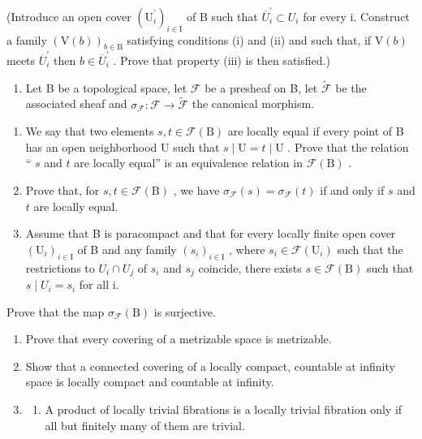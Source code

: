 (Introduce an open cover \((\mathrm{U}_{i}^{\prime})_{i\in\mathrm{I}}\) of B such that \(\overline{U}_{i}^{\prime}\subset U_{i}\) for every i. Construct a family \((\mathrm{V}(b))_{b\in\mathrm{B}}\) satisfying conditions (i) and (ii) and such that, if \(\mathrm{V}(b)\) meets \(\overline{U}_{i}^{\prime}\) then \(b\in\overline{U}_{i}^{\prime}\) . Prove that property (iii) is then satisfied.)

\begin{enumerate}
\def\labelenumi{\arabic{enumi})}
\setcounter{enumi}{7}
\tightlist
\item
  Let B be a topological space, let \(\mathcal{F}\) be a presheaf on B, let \(\widetilde{\mathcal{F}}\) be the associated sheaf and \(\sigma_{\mathcal{F}}\colon \mathcal{F}\to \widetilde{\mathcal{F}}\) the canonical morphism.
\end{enumerate}

\begin{enumerate}
\def\labelenumi{\alph{enumi})}
\item
  We say that two elements \(s, t \in \mathcal{F}(\mathrm{B})\) are locally equal if every point of B has an open neighborhood U such that \(s \mid \mathrm{U} = t \mid \mathrm{U}\) . Prove that the relation “ \(s\) and \(t\) are locally equal” is an equivalence relation in \(\mathcal{F}(\mathrm{B})\) .
\item
  Prove that, for \(s, t \in \mathcal{F}(\mathrm{B})\) , we have \(\sigma_{\mathcal{F}}(s) = \sigma_{\mathcal{F}}(t)\) if and only if \(s\) and \(t\) are locally equal.
\item
  Assume that B is paracompact and that for every locally finite open cover \((\mathrm{U}_{i})_{i\in\mathrm{I}}\) of B and any family \((s_{i})_{i\in\mathrm{I}}\) , where \(s_{i}\in\mathcal{F}(\mathrm{U}_{i})\) such that the restrictions to \(U_{i}\cap U_{j}\) of \(s_{i}\) and \(s_{j}\) coincide, there exists \(s\in\mathcal{F}(\mathrm{B})\) such that \(s\mid U_{i}=s_{i}\) for all i.
\end{enumerate}

Prove that the map \(\sigma_{\mathcal{F}}(\mathrm{B})\) is surjective.

\exercisegroup

\begin{enumerate}
\def\labelenumi{\arabic{enumi})}
\item
  Prove that every covering of a metrizable space is metrizable.
\item
  Show that a connected covering of a locally compact, countable at infinity space is locally compact and countable at infinity.
\item
  \begin{enumerate}
  \def\labelenumii{\alph{enumii})}
  \tightlist
  \item
    A product of locally trivial fibrations is a locally trivial fibration only if all but finitely many of them are trivial.
  \end{enumerate}
\end{enumerate}

